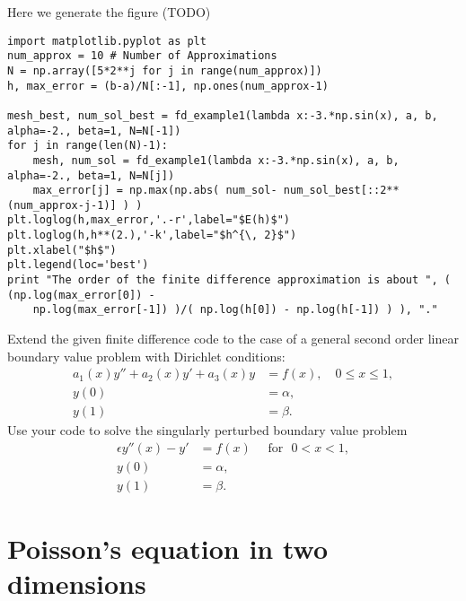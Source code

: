 Here we generate the figure (TODO)
\begin{lstlisting}
import matplotlib.pyplot as plt
num_approx = 10 # Number of Approximations
N = np.array([5*2**j for j in range(num_approx)])
h, max_error = (b-a)/N[:-1], np.ones(num_approx-1)

mesh_best, num_sol_best = fd_example1(lambda x:-3.*np.sin(x), a, b, alpha=-2., beta=1, N=N[-1])
for j in range(len(N)-1): 
    mesh, num_sol = fd_example1(lambda x:-3.*np.sin(x), a, b, alpha=-2., beta=1, N=N[j])
    max_error[j] = np.max(np.abs( num_sol- num_sol_best[::2**(num_approx-j-1)] ) )
plt.loglog(h,max_error,'.-r',label="$E(h)$")
plt.loglog(h,h**(2.),'-k',label="$h^{\, 2}$")
plt.xlabel("$h$")
plt.legend(loc='best')
print "The order of the finite difference approximation is about ", ( (np.log(max_error[0]) - 
    np.log(max_error[-1]) )/( np.log(h[0]) - np.log(h[-1]) ) ), "."
\end{lstlisting}




\begin{problem}
Extend the given finite difference code to the case of a general second order linear boundary value problem with Dirichlet conditions:
\begin{align*}
	a_1(x)y'' +a_2(x)y'+ a_3(x) y&= f(x), \quad 0 \leq x \leq 1,\\
	y(0) &= \alpha,\\
	y(1) &= \beta.
\end{align*}
Use your code to solve the singularly perturbed boundary value problem
\begin{align*}
	\epsilon y''(x)-y'&= f(x) \quad \text{ for } \,\,0 < x < 1, \\
	y(0) &= \alpha, \\
	y(1) &= \beta. 
\end{align*}

\end{problem}





\section{Poisson's equation in two dimensions}

